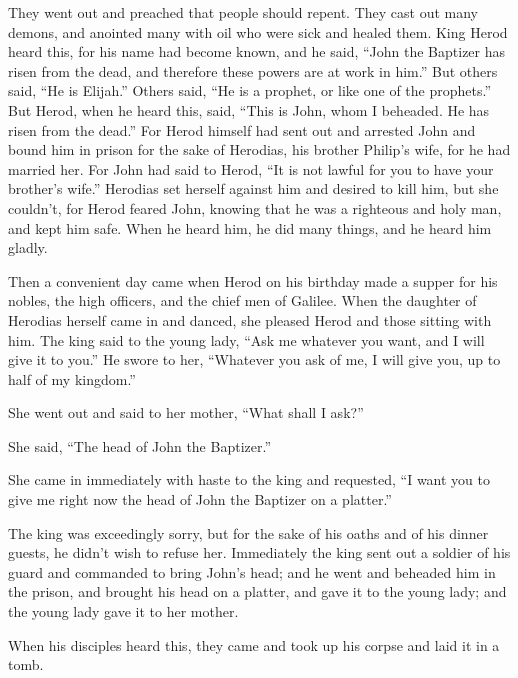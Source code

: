  They went out and preached that people should repent.
 They cast out many demons, and anointed many with oil
who were sick and healed them.  King Herod heard this,
for his name had become known, and he said, ``John the Baptizer has
risen from the dead, and therefore these powers are at work in him.''
 But others said, ``He is Elijah.'' Others said, ``He is
a prophet, or like one of the prophets.''  But Herod,
when he heard this, said, ``This is John, whom I beheaded. He has risen
from the dead.''  For Herod himself had sent out and
arrested John and bound him in prison for the sake of Herodias, his
brother Philip's wife, for he had married her.  For John
had said to Herod, ``It is not lawful for you to have your brother's
wife.''  Herodias set herself against him and desired to
kill him, but she couldn't,  for Herod feared John,
knowing that he was a righteous and holy man, and kept him safe. When he
heard him, he did many things, and he heard him gladly.

 Then a convenient day came when Herod on his birthday
made a supper for his nobles, the high officers, and the chief men of
Galilee.  When the daughter of Herodias herself came in
and danced, she pleased Herod and those sitting with him. The king said
to the young lady, ``Ask me whatever you want, and I will give it to
you.''  He swore to her, ``Whatever you ask of me, I will
give you, up to half of my kingdom.''

 She went out and said to her mother, ``What shall I
ask?''

She said, ``The head of John the Baptizer.''

 She came in immediately with haste to the king and
requested, ``I want you to give me right now the head of John the
Baptizer on a platter.''

 The king was exceedingly sorry, but for the sake of his
oaths and of his dinner guests, he didn't wish to refuse her.
 Immediately the king sent out a soldier of his guard and
commanded to bring John's head; and he went and beheaded him in the
prison,  and brought his head on a platter, and gave it
to the young lady; and the young lady gave it to her mother.

 When his disciples heard this, they came and took up his
corpse and laid it in a tomb.

